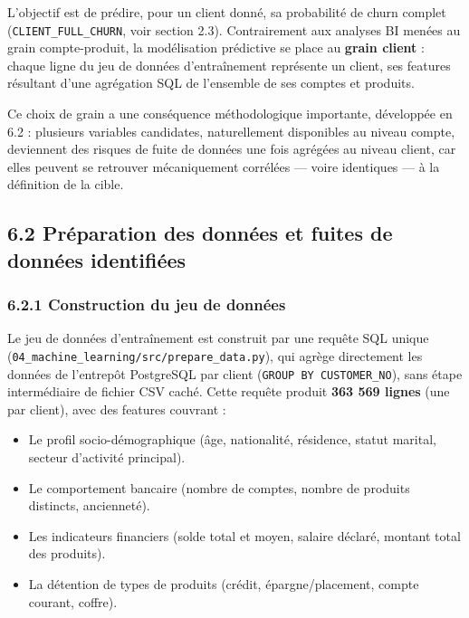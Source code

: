 \documentclass[11pt,a4paper]{article}
\providecommand{\tightlist}{\setlength{\itemsep}{0pt}\setlength{\parskip}{0pt}}
\begin{document}
L'objectif est de prédire, pour un client donné, sa probabilité de churn
complet (\texttt{CLIENT\_\hspace{0pt}FULL\_\hspace{0pt}CHURN}, voir
section 2.3). Contrairement aux analyses BI menées au grain
compte-produit, la modélisation prédictive se place au \textbf{grain
client} : chaque ligne du jeu de données d'entraînement représente un
client, ses features résultant d'une agrégation SQL de l'ensemble de ses
comptes et produits.

Ce choix de grain a une conséquence méthodologique importante,
développée en 6.2 : plusieurs variables candidates, naturellement
disponibles au niveau compte, deviennent des risques de fuite de données
une fois agrégées au niveau client, car elles peuvent se retrouver
mécaniquement corrélées --- voire identiques --- à la définition de la
cible.

\hypertarget{pruxe9paration-des-donnuxe9es-et-fuites-de-donnuxe9es-identifiuxe9es}{%
\subsection{6.2 Préparation des données et fuites de données
identifiées}\label{pruxe9paration-des-donnuxe9es-et-fuites-de-donnuxe9es-identifiuxe9es}}

\hypertarget{construction-du-jeu-de-donnuxe9es}{%
\subsubsection{6.2.1 Construction du jeu de
données}\label{construction-du-jeu-de-donnuxe9es}}

Le jeu de données d'entraînement est construit par une requête SQL
unique
(\texttt{04\_\hspace{0pt}machine\_\hspace{0pt}learning/\hspace{0pt}src/\hspace{0pt}prepare\_\hspace{0pt}data.py}),
qui agrège directement les données de l'entrepôt PostgreSQL par client
(\texttt{GROUP\ BY\ CUSTOMER\_\hspace{0pt}NO}), sans étape intermédiaire
de fichier CSV caché. Cette requête produit \textbf{363 569 lignes} (une
par client), avec des features couvrant :

\begin{itemize}
\tightlist
\item
  Le profil socio-démographique (âge, nationalité, résidence, statut
  marital, secteur d'activité principal).
\item
  Le comportement bancaire (nombre de comptes, nombre de produits
  distincts, ancienneté).
\item
  Les indicateurs financiers (solde total et moyen, salaire déclaré,
  montant total des produits).
\item
  La détention de types de produits (crédit, épargne/placement, compte
  courant, coffre).
\end{itemize}
\end{document}
